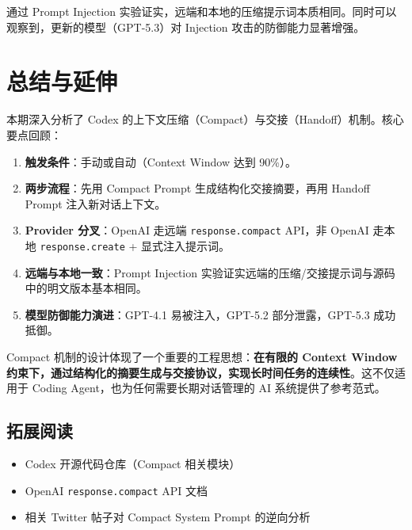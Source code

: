 \documentclass[a4paper]{article}
\begin{document}
通过 Prompt Injection 实验证实，远端和本地的压缩提示词本质相同。同时可以观察到，更新的模型（GPT-5.3）对 Injection 攻击的防御能力显著增强。


\section{总结与延伸}

本期深入分析了 Codex 的上下文压缩（Compact）与交接（Handoff）机制。核心要点回顾：

\begin{enumerate}
    \item \textbf{触发条件}：手动或自动（Context Window 达到 90\%）。
    \item \textbf{两步流程}：先用 Compact Prompt 生成结构化交接摘要，再用 Handoff Prompt 注入新对话上下文。
    \item \textbf{Provider 分叉}：OpenAI 走远端 \texttt{response.compact} API，非 OpenAI 走本地 \texttt{response.create} + 显式注入提示词。
    \item \textbf{远端与本地一致}：Prompt Injection 实验证实远端的压缩/交接提示词与源码中的明文版本基本相同。
    \item \textbf{模型防御能力演进}：GPT-4.1 易被注入，GPT-5.2 部分泄露，GPT-5.3 成功抵御。
\end{enumerate}

Compact 机制的设计体现了一个重要的工程思想：\textbf{在有限的 Context Window 约束下，通过结构化的摘要生成与交接协议，实现长时间任务的连续性}。这不仅适用于 Coding Agent，也为任何需要长期对话管理的 AI 系统提供了参考范式。

\subsection{拓展阅读}

\begin{itemize}
    \item Codex 开源代码仓库（Compact 相关模块）
    \item OpenAI \texttt{response.compact} API 文档
    \item 相关 Twitter 帖子对 Compact System Prompt 的逆向分析
\end{itemize}

\end{document}
